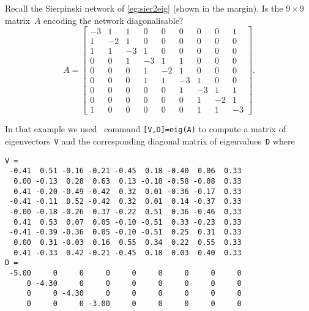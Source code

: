 \begin{example} \label{eg:sier2eigp}
Recall the Sierpinski network of \autoref{eg:sier2eig} (shown in the margin).
Is the \(9\times9\) matrix~\(A\) encoding the network diagonalisable?
%
\begin{equation*}
A=\begin{bmatrix}-3&1&1&0&0&0&0&0&1
\\1&-2&1&0&0&0&0&0&0
\\1&1&-3&1&0&0&0&0&0
\\0&0&1&-3&1&1&0&0&0
\\0&0&0&1&-2&1&0&0&0
\\0&0&0&1&1&-3&1&0&0
\\0&0&0&0&0&1&-3&1&1
\\0&0&0&0&0&0&1&-2&1
\\1&0&0&0&0&0&1&1&-3 \end{bmatrix}.
\end{equation*}
\begin{solution} 
In that example we used \script\ command \verb|[V,D]=eig(A)| to compute a matrix of eigenvectors~\verb|V| and the corresponding diagonal matrix of eigenvalues~\verb|D| where \twodp
{\small%
\begin{verbatim}
V =
 -0.41  0.51 -0.16 -0.21 -0.45  0.18 -0.40  0.06  0.33
  0.00 -0.13  0.28  0.63  0.13 -0.18 -0.58 -0.08  0.33
  0.41 -0.20 -0.49 -0.42  0.32  0.01 -0.36 -0.17  0.33
 -0.41 -0.11  0.52 -0.42  0.32  0.01  0.14 -0.37  0.33
 -0.00 -0.18 -0.26  0.37 -0.22  0.51  0.36 -0.46  0.33
  0.41  0.53  0.07  0.05 -0.10 -0.51  0.33 -0.23  0.33
 -0.41 -0.39 -0.36  0.05 -0.10 -0.51  0.25  0.31  0.33
  0.00  0.31 -0.03  0.16  0.55  0.34  0.22  0.55  0.33
  0.41 -0.33  0.42 -0.21 -0.45  0.18  0.03  0.40  0.33
D =
 -5.00     0     0     0     0     0     0     0     0
     0 -4.30     0     0     0     0     0     0     0
     0     0 -4.30     0     0     0     0     0     0
     0     0     0 -3.00     0     0     0     0     0

\end{verbatim}}
\end{solution}
\end{example}
